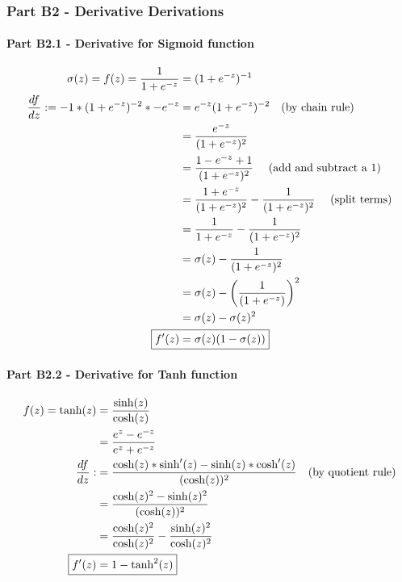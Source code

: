 \documentclass[]{article}
\begin{document}
\subsubsection{Part B2 - Derivative Derivations}
\paragraph{ Part B2.1 -  Derivative for Sigmoid function}

\begin{align*} 
\sigma(z)= f(z) = \frac{1}{1+e^{-z}}  &= (1+ e^{-z})^{-1} \\
\frac{df}{dz} : = -1* (1+ e^{-z})^{-2} * -e^{-z}  &= e^{-z}(1+ e^{-z})^{-2}  \text{~~~(by chain rule)}\\
 &= \frac{e^{-z}}{(1+ e^{-z})^{2}  } \\
 &= \frac{1-e^{-z}+1}{(1+ e^{-z})^{2}  }\text{  ~~~(add and subtract a 1)} \\
 &= \frac{1+e^{-z}}{(1+ e^{-z})^{2} } -  \frac{1}{(1+ e^{-z})^{2} }  \text{  ~~~(split terms)}\\
 &= \frac{1}{1+ e^{-z} } -  \frac{1}{(1+ e^{-z})^{2} }  \\
 &= \sigma(z) -  \frac{1}{(1+ e^{-z})^{2} }  \\
 &= \sigma(z) -  \left ( \frac{1}{(1+ e^{-z}) } \right )^2  \\
 &= \sigma(z) -  \sigma(z)^2  \\
\Aboxed{f'(z) &= \sigma(z) (1-  \sigma(z)) } \\
\end{align*}

\paragraph{Part B2.2 - Derivative for Tanh function}

\begin{align*} 
f(z) = \text{tanh}(z) &= \frac{\text{sinh}(z)}{\text{cosh}(z)} \\
&= \frac{e^z - e^{-z}}{e^z + e^{-z}} \\
\frac{df}{dz} : &=  \frac{\text{cosh}(z) * \text{sinh}'(z) -  \text{sinh}(z)  * \text{cosh}'(z)}{(\text{cosh}(z))^2}  \text{~~~(by quotient rule)} \\ 
&=  \frac{\text{cosh}(z)^2 -  \text{sinh}(z)^2 }{(\text{cosh}(z))^2} \\ 
&=  \frac{\text{cosh}(z)^2}{\text{cosh}(z)^2} - \frac{\text{sinh}(z)^2}{\text{cosh}(z)^2}\\ 
\Aboxed{f'(z) &= 1- \text{tanh}^2(z)}\\ 
\end{align*}
\end{document}
